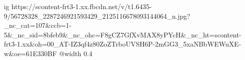  
 
 
 
 

\ifcmt
  ig https://scontent-frt3-1.xx.fbcdn.net/v/t1.6435-9/56728328_2287246921593429_2125116678093144064_n.jpg?_nc_cat=107&ccb=1-5&_nc_sid=8bfeb9&_nc_ohc=F8gCZ7GfXvMAX8yPYcH&_nc_ht=scontent-frt3-1.xx&oh=00_AT-IZ3qf4z80ZoZTrboUVSH6P-2mGG3_5xaNBbWEWuXE-w&oe=61E330BF
  @width 0.4
\fi
